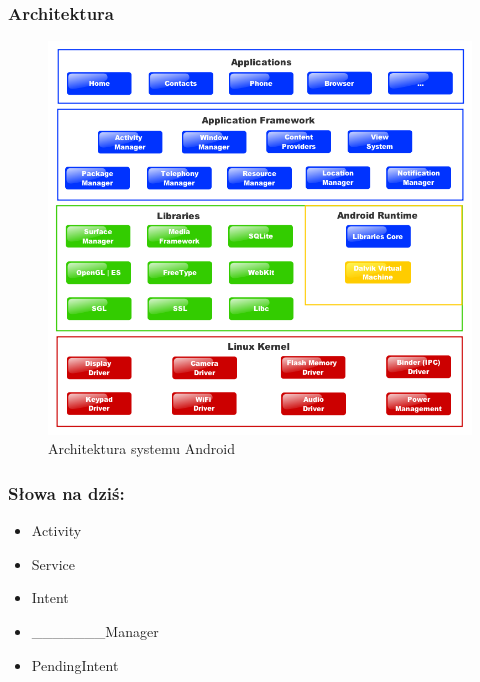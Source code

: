 \documentclass{beamer}
\begin{document}
\begin{frame}\frametitle{Architektura}

  \begin{figure}[t]
    \includegraphics[height=0.62\textheight,keepaspectratio=true,clip=true]{images/platform}
    \caption{Architektura systemu Android}
  \end{figure}

\end{frame}

\begin{frame}
 \frametitle{Słowa na dziś:}
 \begin{itemize}
  \item \Huge{Activity}
  \item \Huge{Service}
  \item \Huge{Intent}
  \item \_\_\_\_\_\_\_\Huge{Manager}
  \item \Huge{PendingIntent}
 \end{itemize}

\end{frame}
\end{document}

